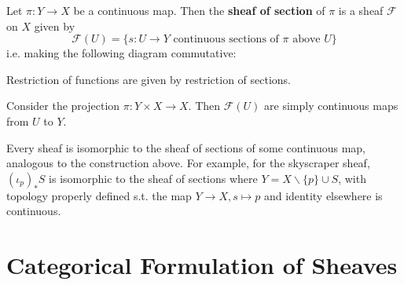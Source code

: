 \documentclass{article}
\begin{document}
\begin{definition}
    Let $\pi: Y \to X$ be a continuous map. Then the \textbf{sheaf of section} of $\pi$ is a sheaf $\mathcal{F}$ on $X$ given by
    \[
        \mathcal{F}(U) = \{ s: U \to Y  \text{ continuous sections of $\pi$ above $U$}\}
    \]
    i.e. making the following diagram commutative:

    \begin{minipage}{\linewidth}
        \centering
    \end{minipage}
    Restriction of functions are given by restriction of sections.
\end{definition}
\nogap
\begin{example}
    Consider the projection $\pi: Y \times X \to X$. Then $\mathcal{F}(U)$ are simply continuous maps from $U$ to $Y$.
\end{example}

\begin{remark}
    Every sheaf is isomorphic to the sheaf of sections of some continuous map, analogous to the construction above. For example, for the skyscraper sheaf, $(\iota_p)_{\ast} S$ is isomorphic to the sheaf of sections where $Y = X \smallsetminus \{ p \} \cup S$, with topology properly defined s.t. the map $Y \to X, s \mapsto p$ and identity elsewhere is continuous.
\end{remark}

\section{Categorical Formulation of Sheaves}
\end{document}
